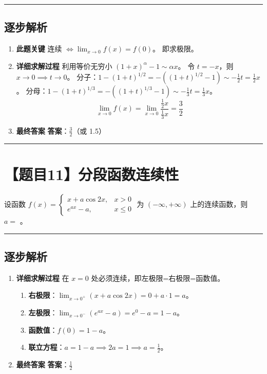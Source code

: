 \documentclass[UTF8]{ctexart}
\newenvironment{redenv}{\color{red}}{}
\newenvironment{detailedanalysis}{%
    \color{red}
    \begin{enumerate}[label=\textbf{第\arabic*步：}, leftmargin=*, align=left, itemsep=1.5ex]
}{%
    \end{enumerate}
}
\newcommand{\problemrule}{\noindent\rule{\textwidth}{1.5pt}\vspace{-0.8em}}
\newcommand{\analysisrule}{\noindent\rule{\textwidth}{0.8pt}\vspace{-0.8em}}
\newcommand{\blank}[1]{\underline{\hspace{#1}}}
\begin{document}
\begin{redenv}
\analysisrule
\subsection*{逐步解析}

\begin{detailedanalysis}
\item \textbf{此题关键}
连续 $\iff \lim_{x \to 0} f(x) = f(0)$。
即求极限。

\item \textbf{详细求解过程}
利用等价无穷小 $(1+x)^\alpha - 1 \sim \alpha x$。
令 $t = -x$，则 $x \to 0 \implies t \to 0$。
分子：$1 - (1+t)^{1/2} = -((1+t)^{1/2} - 1) \sim -\frac{1}{2}t = \frac{1}{2}x$。
分母：$1 - (1+t)^{1/3} = -((1+t)^{1/3} - 1) \sim -\frac{1}{3}t = \frac{1}{3}x$。
$$ \lim_{x \to 0} f(x) = \lim_{x \to 0} \frac{\frac{1}{2}x}{\frac{1}{3}x} = \frac{3}{2} $$

\item \textbf{最终答案}
\textbf{答案}：$ \frac{3}{2} $（或 1.5）
\end{detailedanalysis}
\end{redenv}

\problemrule
\section*{【题目11】分段函数连续性}
设函数 $ f(x)=\begin{cases}x+a\cos2x, & x>0\\ e^{ax}-a, & x\leq0\end{cases} $ 为 $ (-\infty,+\infty) $ 上的连续函数，则 $ a= $ \blank{2cm}。

\begin{redenv}
\analysisrule
\subsection*{逐步解析}

\begin{detailedanalysis}
\item \textbf{详细求解过程}
在 $x=0$ 处必须连续，即左极限=右极限=函数值。
\begin{enumerate}[label=(\arabic*)]
\item \textbf{右极限}：$\lim_{x \to 0^+} (x + a\cos 2x) = 0 + a \cdot 1 = a$。
\item \textbf{左极限}：$\lim_{x \to 0^-} (e^{ax} - a) = e^0 - a = 1 - a$。
\item \textbf{函数值}：$f(0) = 1 - a$。
\item \textbf{联立方程}：$a = 1 - a \implies 2a = 1 \implies a = \frac{1}{2}$。
\end{enumerate}

\item \textbf{最终答案}
\textbf{答案}：$ \frac{1}{2} $
\end{detailedanalysis}
\end{redenv}
\end{document}
